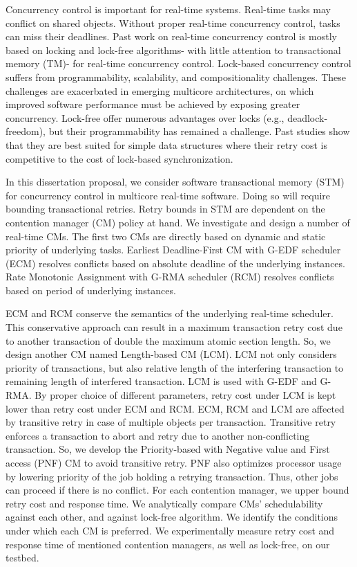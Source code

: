 \documentclass[12pt,english]{report}
\begin{document}
\thispagestyle{empty}

Concurrency control is important for real-time systems. Real-time tasks may conflict on shared objects. Without proper real-time concurrency control, tasks can miss their deadlines. Past work on real-time concurrency control is mostly based on locking and lock-free algorithms- with little attention to transactional memory (TM)- for real-time concurrency control. Lock-based concurrency control suffers from programmability, scalability, and compositionality challenges. These challenges are exacerbated in emerging multicore architectures, on which improved software performance must be achieved by exposing greater concurrency. Lock-free offer numerous advantages over locks (e.g., deadlock-freedom), but their programmability has remained a challenge. Past studies show that they are best suited for simple data structures where their retry cost is competitive to the cost of lock-based synchronization.

In this dissertation proposal, we consider software transactional memory (STM) for concurrency control in multicore real-time software. Doing so will require bounding transactional retries. Retry bounds in STM are dependent on the contention manager (CM) policy at hand. We investigate and design a number of real-time CMs. The first two CMs are directly based on dynamic and static priority of underlying tasks. Earliest Deadline-First CM with G-EDF scheduler (ECM) resolves conflicts based on absolute deadline of the underlying instances. Rate Monotonic Assignment with G-RMA scheduler (RCM) resolves conflicts based on period of underlying instances.

ECM and RCM conserve the semantics of the underlying real-time scheduler. This conservative approach can result in a maximum transaction retry cost due to another transaction of double the maximum atomic section length. So, we design another CM named Length-based CM (LCM). LCM not only considers priority of transactions, but also relative length of the interfering transaction to remaining length of interfered transaction. LCM is used with G-EDF and G-RMA. By proper choice of different parameters, retry cost under LCM is kept lower than retry cost under ECM and RCM. ECM, RCM and LCM are affected by transitive retry in case of multiple objects per transaction. Transitive retry enforces a transaction to abort and retry due to another non-conflicting transaction. So, we develop the Priority-based with Negative value and First access (PNF) CM to avoid transitive retry. PNF also optimizes processor usage by lowering priority of the job holding a retrying transaction. Thus, other jobs can proceed if there is no conflict. For each contention manager, we upper bound retry cost and response time. We analytically compare CMs' schedulability against each other, and against lock-free algorithm. We identify the conditions under which each CM is preferred. We experimentally measure retry cost and response time of mentioned contention managers, as well as lock-free, on our testbed.
\end{document}

